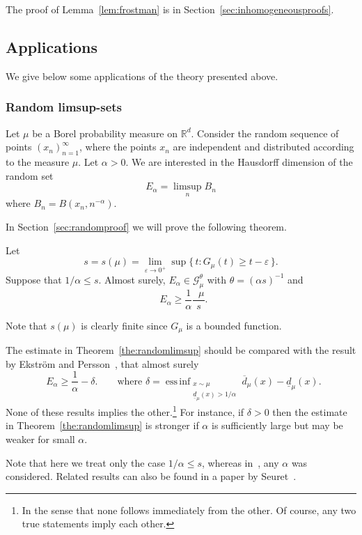 \documentclass[AHL,Unicode,longabstracts]{cedram}
\DeclareMathOperator{\dimh}{dim_H}
\DeclareMathOperator{\udimh}{\overline{dim}_H}
\DeclareMathOperator*{\essinf}{ess\,inf}
\newcommand*{\dimh}{\mathrm{dim}_{\mathrm{H}}}
\begin{document}
The proof of Lemma~\ref{lem:frostman} is in Section~\ref{sec:inhomogeneousproofs}.

\subsection{Applications} \label{sec:applications}

We give below some applications of the theory presented above.

\subsubsection{Random limsup-sets} \label{sec:random}

Let $\mu$ be a Borel probability measure on $\mathbb{R}^d$. Consider the random sequence of points $(x_n)_{n=1}^\infty$, where the points $x_n$ are independent and distributed according to the measure $\mu$. Let $\alpha > 0$. We are interested in the Hausdorff dimension of the random set
\[
E_\alpha = \limsup_n B_n
\]
where $B_n = B(x_n,n^{-\alpha})$.

In Section~\ref{sec:randomproof} we will prove the following theorem.

\begin{theo}\label{the:randomlimsup}
Let
\[
s = s (\mu) = \lim_{\varepsilon \to 0^+} \sup \{\, t : G_\mu (t)
\geq t - \varepsilon \,\}.
\]
Suppose that $1/\alpha \leq s$. Almost surely, $E_\alpha \in
\mathscr{G}_\mu^\theta$ with $\theta = (\alpha s)^{-1}$ and
\[
\dimh E_\alpha \geq \frac{1}{\alpha} \frac{\udimh \mu}{s}.
\]
\end{theo}

Note that $s (\mu)$ is clearly finite since $G_\mu$ is a bounded function.

The estimate in Theorem~\ref{the:randomlimsup} should be compared with the result by Ekstr\"om and Persson~\cite[Theorem~1]{ekstrompersson}, that almost surely
\[
\dimh E_\alpha \geq \frac{1}{\alpha} - \delta. \qquad \text{where }
\delta = \essinf_{\substack{x \sim \mu \\ \underline{d}_\mu (x) > 1 /
\alpha}} \overline{d}_\mu (x) - \underline{d}_\mu (x).
\]
None of these results implies the other.\footnote{In the sense that none follows immediately from the other. Of course, any two true statements imply each other.} For instance, if $\delta > 0$ then the estimate in Theorem~\ref{the:randomlimsup} is stronger if $\alpha$ is sufficiently large but may be weaker for small $\alpha$.

Note that here we treat only the case $1/\alpha \leq s$, whereas in~\cite{ekstrompersson}, any $\alpha$ was considered. Related results can also be found in a paper by Seuret~\cite{seuret}.
\end{document}
